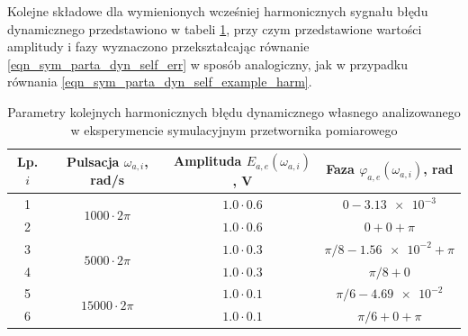 Kolejne składowe dla wymienionych wcześniej harmonicznych sygnału błędu dynamicznego przedstawiono w tabeli \ref{tab_sym_parta_params_dyn_list}, przy czym przedstawione wartości amplitudy i fazy wyznaczono przekształcając równanie \eqref{eqn_sym_parta_dyn_self_err} w sposób analogiczny, jak w przypadku równania \eqref{eqn_sym_parta_dyn_self_example_harm}.

\begin{table}[htb!]
\begin{center}
\caption{Parametry kolejnych harmonicznych błędu dynamicznego własnego analizowanego w eksperymencie symulacyjnym przetwornika pomiarowego \label{tab_sym_parta_params_dyn_list}}
\begin{tabular}[c]{| c | c | c | c |} \hline
\textbf{Lp. $i$} & \textbf{Pulsacja $\omega_{a,i}$, rad/s} & \textbf{Amplituda $E_{a,e}(\omega_{a,i})$, V} & \textbf{Faza $\varphi_{a,e}(\omega_{a,i})$, rad} \\ \hline
1 & \multirow{2}{*}{$1000  \cdot 2\pi$} &  $1.0 \cdot 0.6$       & $0 - \num{3.13e-3}$            \\ \cline{1-1} \cline{3-4}
2 &                                     &  $1.0 \cdot 0.6$       & $0 + 0 + \pi$                  \\ \hline
3 & \multirow{2}{*}{$5000  \cdot 2\pi$} &  $1.0 \cdot 0.3$       & $\pi/8 - \num{1.56e-2} + \pi$  \\ \cline{1-1} \cline{3-4}
4 &                                     &  $1.0 \cdot 0.3$       & $\pi/8 + 0$                    \\ \hline
5 & \multirow{2}{*}{$15000 \cdot 2\pi$} &  $1.0 \cdot 0.1$       & $\pi/6 - \num{4.69e-2}$        \\ \cline{1-1} \cline{3-4}
6 &                                     &  $1.0 \cdot 0.1$       & $\pi/6 + 0 +\pi$               \\ \hline
\end{tabular}
\end{center}
\end{table}


